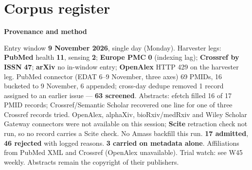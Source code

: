 \documentclass[10pt]{article}
\begin{document}
\clearpage
\section*{\sffamily\bfseries\color{Deep}Corpus register}
\vspace{-1.5mm}{\color{Amber}\rule{\linewidth}{1.1pt}}\vspace{2.5mm}



\vspace{2mm}

\begin{keybox}
{\sffamily\bfseries\footnotesize\color{Deep}Provenance and method}\\[1.2mm]
{\fontsize{7.2}{8.8}\selectfont
Entry window \textbf{9 November 2026}, single day (Monday). Harvester legs: \textbf{PubMed} health \textbf{11}, sensing \textbf{2}; \textbf{Europe PMC} \textbf{0} (indexing lag); \textbf{Crossref by ISSN} \textbf{47}; \textbf{arXiv} no in-window entry; \textbf{OpenAlex} HTTP 429 on the harvester leg. PubMed connector (EDAT 6--9 November, three axes) 69 PMIDs, 16 bucketed to 9 November, 6 appended; cross-day dedupe removed 1 record assigned to an earlier issue --- \textbf{63 screened}. Abstracts: efetch filled 16 of 17 PMID records; Crossref/Semantic Scholar recovered one line for one of three Crossref records tried.
OpenAlex, alphaXiv, bioRxiv/medRxiv and Wiley Scholar Gateway connectors were not available on this session; \textbf{Scite} retraction check not run, so no record carries a Scite check. No Amass backfill this run.
\textbf{17 admitted}, \textbf{46 rejected} with logged reasons. \textbf{3 carried on metadata alone}. Affiliations from PubMed XML and Crossref (OpenAlex unavailable). Trial watch: see W45 weekly.
Abstracts remain the copyright of their publishers.\par}
\end{keybox}
\end{document}
